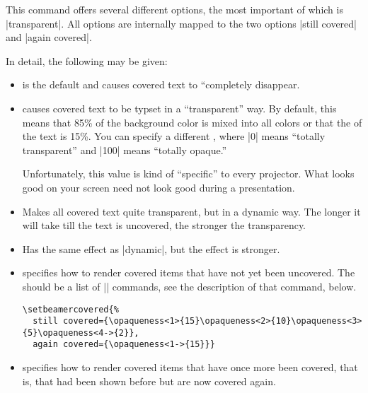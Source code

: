 \begin{command}{\setbeamercovered{}}
  This command offers several different options, the most important of
  which is |transparent|. All options are internally mapped to the two
  options |still covered| and |again covered|.

  In detail, the following  may be given:
  \begin{itemize}
  \item {} is the default and causes covered text
    to ``completely disappear.
  \item {} causes
    covered text to be typset in a ``transparent'' way. By default,
    this means that 85\% of the background color is mixed into all
    colors or that the  of the text is 15\%. You can
    specify a different , where |0| means ``totally
    transparent'' and |100| means ``totally opaque.''

    Unfortunately, this value is kind of ``specific'' to every
    projector. What looks good on your screen need not look good
    during a presentation.
  \item {} Makes all covered text quite transparent,
    but in a dynamic way. The longer it will take till the text is
    uncovered, the stronger the transparency. 
  \item {} Has the same effect as |dynamic|,
    but the effect is stronger.
  \item {} specifies  how
    to render covered items that have not yet been uncovered. The
     should be a list of |\opaqueness| commands,
    see the description of that command, below.
    \example
\begin{verbatim}
\setbeamercovered{%
  still covered={\opaqueness<1>{15}\opaqueness<2>{10}\opaqueness<3>{5}\opaqueness<4->{2}},
  again covered={\opaqueness<1->{15}}}
\end{verbatim}
  \item {} specifies how
    to render covered items that have once more been covered, that is,
    that had been shown before but are now covered again.
  \end{itemize}
\end{command}

